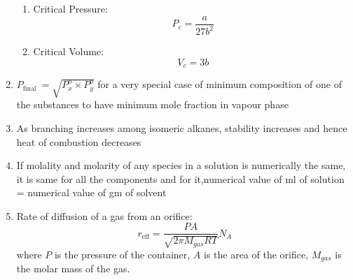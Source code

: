 \documentclass{article}
\numberwithin{equation}{section}
\numberwithin{figure}{section}
\begin{document}
\begin{enumerate}
\begin{enumerate}
			\item Critical Pressure:
				\begin{equation}
					P_{c}=\frac{a}{27b^2}
				\end{equation}
			\item Critical Volume:
				\begin{equation}
					V_{c}=3b
				\end{equation}
		\end{enumerate}
	\item $ P_{\text {final }}=\sqrt{P_{x}^{o} \times P_{y}^{o}}$ for a very special case of minimum composition of one of the substances to have minimum mole fraction in vapour phase
	\item As branching increases among isomeric alkanes, stability increases and hence heat of combustion decreases

	\item If molality and molarity of any species in a solution is numerically the same, it is same for all the components and for it,numerical value of ml of solution = numerical value of gm of solvent
	\item Rate of diffusion of a gas from an orifice:
		\begin{equation}
			r_{\text{eff}}=\frac{P A}{\sqrt{2\pi M_{gas}RT}}N_{A}
		\end{equation}
		where $P$ is the pressure of the container, $A$ is the area of the orifice, $M_{gas}$ is the molar mass of the gas. 
\end{enumerate}
\end{document}
